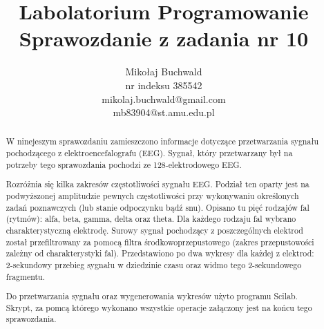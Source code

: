 \documentclass{article}
\begin{document}

\title{Labolatorium Programowanie\\Sprawozdanie z zadania nr 10}
\author{Mikołaj Buchwald\\nr indeksu 385542\\mikolaj.buchwald@gmail.com\\mb83904@st.amu.edu.pl}
\maketitle

\begin{abstract}
    W ninejeszym sprawozdaniu zamieszczono informacje dotyczące przetwarzania sygnału pochodzącego z elektroencefalografu (EEG). Sygnał, który przetwarzany był na potrzeby tego sprawozdania pochodzi ze 128-elektrodowego EEG.
    
    Rozróżnia się kilka zakresów częstotliwości sygnału EEG. Podział ten oparty jest na podwyższonej amplitudzie pewnych częstotliwości przy wykonywaniu określonych zadań poznawczych (lub stanie odpoczynku bądź snu). Opisano tu pięć rodzajów fal (rytmów): alfa, beta, gamma, delta oraz theta. Dla każdego rodzaju fal wybrano charakterystyczną elektrodę. Surowy sygnał pochodzący z poszczególnych elektrod został przefiltrowany za pomocą filtra środkowoprzepustowego (zakres przepustowości zależny od charakterystyki fal). Przedstawiono po dwa wykresy dla każdej z elektrod: 2-sekundowy przebieg sygnału w dziedzinie czasu oraz  widmo tego 2-sekundowego fragmentu.
    
    Do przetwarzania sygnału oraz wygenerowania wykresów użyto programu Scilab. Skrypt, za pomcą którego wykonano wszystkie operacje załączony jest na końcu tego sprawozdania.
\end{abstract}

\newpage
\end{document}

